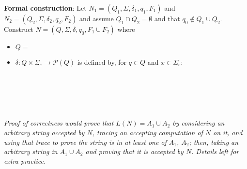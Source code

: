 \documentclass[12pt, oneside]{article}
\begin{document}
{\bf Formal construction}: Let 
$N_1 = (Q_1, \Sigma, \delta_1, q_1, F_1)$ and $N_2 = (Q_2, \Sigma, \delta_2,q_2, F_2)$
and assume $Q_1 \cap Q_2 = \emptyset$ and that $q_0 \notin Q_1 \cup Q_2$.
Construct $N = (Q, \Sigma, \delta, q_0, F_1 \cup F_2)$ where
\begin{itemize}
    \item $Q = $
    \item $\delta: Q \times \Sigma_\varepsilon \to \mathcal{P}(Q)$ is defined by, for $q \in Q$ and $x \in \Sigma_{\varepsilon}$:
        \[
            \phantom{\delta((q,x))=\begin{cases}  \delta_1 ((q,x)) &\qquad\text{if } q\in Q_1 \\ \delta_2 ((q,x)) &\qquad\text{if } q\in Q_2 \\ \{q1,q2\} &\qquad\text{if } q = q_0, x = \varepsilon \\ \emptyset\text{if } q= q_0, x \neq \varepsilon \end{cases}}
        \]
\end{itemize}


\vfill
{\it Proof of correctness would prove that $L(N) = A_1 \cup A_2$ by considering
an arbitrary string accepted by $N$, tracing an accepting computation of $N$ on it, and using 
that trace to prove the string is in at least one of $A_1$, $A_2$; then, taking an arbitrary 
string in $A_1 \cup A_2$ and proving that it is accepted by $N$. Details left for extra practice.}
 \vfill
\end{document}
